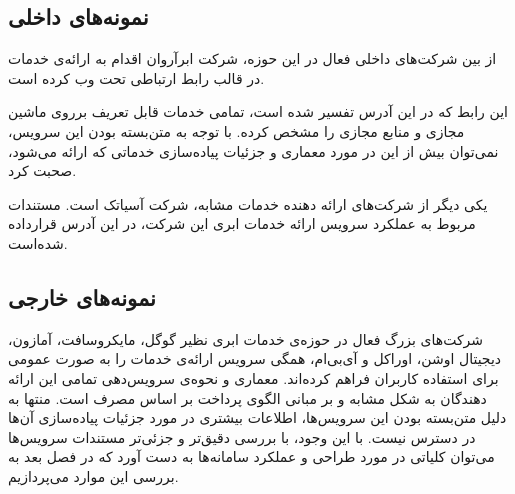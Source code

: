 \subsection{نمونه‌های داخلی}
از بین شرکت‌های داخلی فعال در این حوزه، شرکت ابرآروان اقدام به ارائه‌ی خدمات  در قالب رابط ارتباطی تحت وب کرده است.

این رابط که در این آدرس\cite{arvancloud} تفسیر شده است، تمامی خدمات قابل تعریف برروی ماشین مجازی و منابع مجازی را مشخص کرده. با توجه به متن‌بسته بودن این سرویس، نمی‌توان بیش از این در مورد معماری و جزئیات پیاده‌سازی خدماتی که ارائه می‌شود، صحبت کرد.


یکی دیگر از شرکت‌های ارائه دهنده خدمات مشابه، شرکت آسیاتک است. مستندات مربوط به عملکرد سرویس ارائه خدمات ابری این شرکت، در این آدرس\cite{asiatech} قرارداده شده‌است.


\subsection{نمونه‌های خارجی}
شرکت‌های بزرگ فعال در حوزه‌ی خدمات ابری نظیر گوگل، مایکروسافت، آمازون، دیجیتال اوشن، اوراکل و آی‌بی‌ام، همگی سرویس ارائه‌ی خدمات  را به صورت عمومی برای استفاده کاربران فراهم کرده‌اند. معماری و نحوه‌ی سرویس‌دهی تمامی این ارائه دهندگان به شکل مشابه و بر مبانی الگوی پرداخت بر اساس مصرف است. منتها به دلیل متن‌بسته بودن این سرویس‌ها، اطلاعات بیشتری در مورد جزئیات پیاده‌سازی آن‌ها در دسترس نیست. با این وجود، با بررسی دقیق‌تر و جزئی‌تر مستندات سرویس‌ها می‌توان کلیاتی در مورد طراحی و عملکرد سامانه‌ها به دست آورد که در فصل بعد به بررسی این موارد می‌پردازیم.